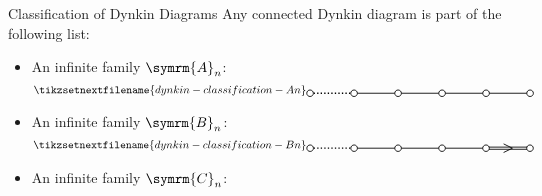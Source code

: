 \documentclass[fleqn]{NotesClass}
\newcommand{\dynkin}[2]{\symrm{#1}_{#2}}
\begin{document}
    \begin{thm}{Classification of Dynkin Diagrams}{}
        Any connected Dynkin diagram is part of the following list:
        \begin{itemize}
            \item An infinite family \(\dynkin{A}{n}\):
            \begin{equation*}
                \tikzsetnextfilename{dynkin-classification-An}
                \begin{tikzpicture}[baseline=(current bounding box), scale=0.7]
                    \draw[dotted, very thick] (0, 0) -- (2, 0);
                    \draw[thick] (2, 0) -- (10, 0);
                    \draw[thick, fill=white] (0, 0) circle [radius=0.15];
                    \draw[thick, fill=white] (2, 0) circle [radius=0.15];
                    \draw[thick, fill=white] (4, 0) circle [radius=0.15];
                    \draw[thick, fill=white] (6, 0) circle [radius=0.15];
                    \draw[thick, fill=white] (8, 0) circle [radius=0.15];
                    \draw[thick, fill=white] (10, 0) circle [radius=0.15];
                \end{tikzpicture}
            \end{equation*}
            \item An infinite family \(\dynkin{B}{n}\):
            \begin{equation*}
                \tikzsetnextfilename{dynkin-classification-Bn}
                \begin{tikzpicture}[baseline=(current bounding box), scale=0.7]
                    \draw[dotted, very thick] (0, 0) -- (2, 0);
                    \draw[thick] (2, 0) -- (8, 0);
                    \draw[thick, yshift=0.05cm] (8, 0) -- (10, 0);
                    \draw[thick, yshift=-0.05cm] (8, 0) -- (10, 0);
                    \draw[thick, fill=white] (0, 0) circle [radius=0.15];
                    \draw[thick, fill=white] (2, 0) circle [radius=0.15];
                    \draw[thick, fill=white] (4, 0) circle [radius=0.15];
                    \draw[thick, fill=white] (6, 0) circle [radius=0.15];
                    \draw[thick, fill=white] (8, 0) circle [radius=0.15];
                    \draw[thick, fill=white] (10, 0) circle [radius=0.15];
                    \draw[thick] (8.8, 0.2) -- (9.2, 0) -- (8.8, -0.2);
                \end{tikzpicture}
            \end{equation*}
            \item An infinite family \(\dynkin{C}{n}\):

\end{itemize}
\end{thm}
\end{document}
